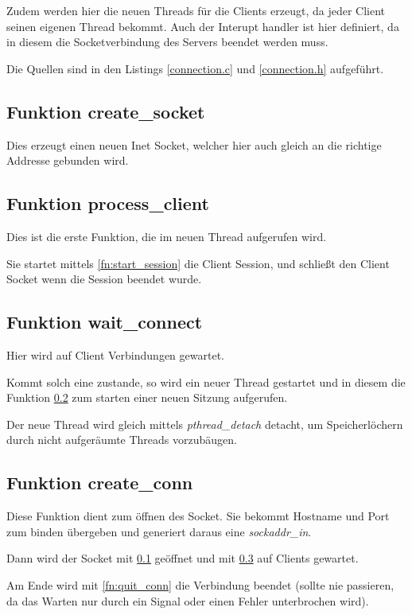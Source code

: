\documentclass[pdftex,final,a4paper,10pt,notitlepage,halfparskip]{scrreprt}
\begin{document}
Zudem werden hier die neuen Threads für die Clients erzeugt, da jeder Client seinen eigenen Thread bekommt. Auch der Interupt handler ist hier definiert, da in diesem die Socketverbindung des Servers beendet werden muss.

Die Quellen sind in den Listings \ref{connection.c} und \ref{connection.h} aufgeführt.




\subsection{Funktion create\_socket}\label{fn:create_socket}
Dies erzeugt einen neuen Inet Socket, welcher hier auch gleich an die richtige Addresse gebunden wird.

\subsection{Funktion process\_client}\label{fn:process_client}
Dies ist die erste Funktion, die im neuen Thread aufgerufen wird.

Sie startet mittels \ref{fn:start_session} die Client Session, und schließt den Client Socket wenn die Session beendet wurde.

\subsection{Funktion wait\_connect}\label{fn:wait_connect}
Hier wird auf Client Verbindungen gewartet. 

Kommt solch eine zustande, so wird ein neuer Thread gestartet und in diesem die Funktion \ref{fn:process_client} zum starten einer neuen Sitzung aufgerufen.

Der neue Thread wird gleich mittels \textit{pthread\_detach} detacht, um Speicherlöchern durch nicht aufgeräumte Threads vorzubäugen.

\subsection{Funktion create\_conn}\label{fn:create_conn}
Diese Funktion dient zum öffnen des Socket. Sie bekommt Hostname und Port zum binden übergeben und generiert daraus eine \textit{sockaddr\_in}.

Dann wird der Socket mit \ref{fn:create_socket} geöffnet und mit \ref{fn:wait_connect} auf Clients gewartet.

Am Ende wird mit \ref{fn:quit_conn} die Verbindung beendet (sollte nie passieren, da das Warten nur durch ein Signal oder einen Fehler unterbrochen wird).
\end{document}
